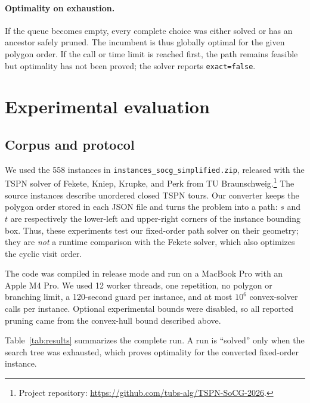 \documentclass[11pt]{article}
\begin{document}
\paragraph{Optimality on exhaustion.}
If the queue becomes empty, every complete choice was either solved or has an
ancestor safely pruned. The incumbent is thus globally optimal for the given
polygon order. If the call or time limit is reached first, the path remains
feasible but optimality has not been proved; the solver reports
\texttt{exact=false}.

\section{Experimental evaluation}
\label{sec:experiments}

\subsection{Corpus and protocol}

We used the 558 instances in \texttt{instances\_socg\_simplified.zip}, released
with the TSPN solver of Fekete, Kniep, Krupke, and Perk from TU Braunschweig.\footnote{Project repository:
\url{https://github.com/tubs-alg/TSPN-SoCG-2026}.}
The source instances describe unordered closed TSPN tours. Our converter keeps
the polygon order stored in each JSON file and turns the problem into a path:
$s$ and $t$ are respectively the lower-left and upper-right corners of the
instance bounding box. Thus, these experiments test our fixed-order path
solver on their geometry; they are \emph{not} a runtime comparison with the
Fekete solver, which also optimizes the cyclic visit order.

The code was compiled in release mode and run on a MacBook Pro with an Apple
M4 Pro. We used 12 worker threads, one repetition, no polygon or branching
limit, a 120-second guard per instance, and at most $10^6$ convex-solver calls per
instance. Optional experimental bounds were disabled, so all reported pruning
came from the convex-hull bound described above.

Table~\ref{tab:results} summarizes the complete run. A run is ``solved'' only
when the search tree was exhausted, which proves optimality for the converted
fixed-order instance.
\end{document}

